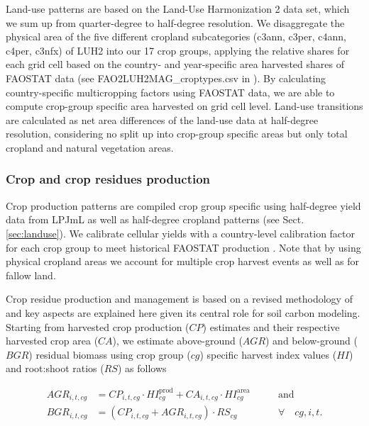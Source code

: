 \documentclass[gc, manuscript]{copernicus}
\begin{document}
Land-use patterns are based on the Land-Use Harmonization 2 \citep{hurtt_harmonization_2020} data set, which we sum up from quarter-degree to half-degree resolution. We disaggregate the physical area of the five different cropland subcategories (c3ann, c3per, c4ann, c4per, c3nfx) of LUH2 into our 17 crop groups, applying the relative shares for each grid cell based on the country- and year-specific area harvested shares of FAOSTAT data \citep{faostat_faostat_2016} (see FAO2LUH2MAG\_croptypes.csv in \citep{mrcommons}). By calculating country-specific multicropping factors using FAOSTAT data, we are able to compute crop-group specific area harvested on grid cell level.
Land-use transitions are calculated as net area differences of the land-use data at half-degree resolution, considering no split up into crop-group specific areas but only total cropland and natural vegetation areas.

\hypertarget{sec:residues}{%
\subsubsection{Crop and crop residues production}\label{sec:residues}}

Crop production patterns are compiled crop group specific using half-degree yield data from LPJmL \citep{schaphoff_lpjml4_2018} as well as half-degree cropland patterns (see Sect. \ref{sec:landuse}). We calibrate cellular yields with a country-level calibration factor for each crop group to meet historical FAOSTAT production \citep{faostat_faostat_2016}. Note that by using physical cropland areas we account for multiple crop harvest events as well as for fallow land.

Crop residue production and management is based on a revised methodology of \citep{bodirsky_n2o_2012} and key aspects are explained here given its central role for soil carbon modeling. Starting from harvested crop production (\(CP\)) estimates and their respective harvested crop area (\(CA\)), we estimate above-ground (\(AGR\)) and below-ground (\(BGR\)) residual biomass using crop group (\(cg\)) specific harvest index values (\(HI\)) and root:shoot ratios (\(RS\)) as follows

\begin{equation}
\begin{aligned}
AGR_{i,t,cg} & = CP_{i,t,cg} \cdot HI^{\mathrm{prod}}_{cg} + CA_{i,t,cg} \cdot HI^{\mathrm{area}}_{cg}
\qquad & \textrm{and} \\
BGR_{i,t,cg} & = (CP_{i,t,cg} + AGR_{i,t,cg}) \cdot RS_{cg} \qquad                                            & \forall\quad cg, i, t.
\label{eq:resbiomass}
\end{aligned}
\end{equation}
\end{document}
